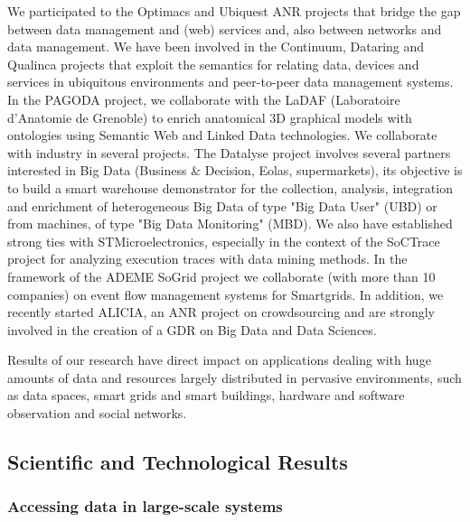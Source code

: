 We participated to the Optimacs and Ubiquest ANR projects that bridge the gap between data management and (web) services and, also  between networks and data management.   
We have been involved in the Continuum, Dataring and Qualinca projects that exploit the semantics for relating data, devices and services in ubiquitous environments and peer-to-peer data management systems. In the PAGODA project, we collaborate with the LaDAF (Laboratoire d'Anatomie de Grenoble) to enrich anatomical 3D graphical models with ontologies using Semantic Web and Linked Data technologies. We collaborate with industry in several projects. The Datalyse project involves several partners interested in Big Data (Business \& Decision, Eolas, supermarkets), its objective is to build a smart warehouse demonstrator for the collection, analysis, integration and enrichment of heterogeneous Big Data  of type "Big Data User" (UBD) or from machines, of type "Big Data Monitoring" (MBD).   We also have established strong ties with STMicroelectronics, especially in the context of the SoCTrace project for analyzing execution traces with data mining methods. In the framework of the ADEME SoGrid project we collaborate (with more than 10 companies) on  event flow management systems for Smartgrids.  In addition,  we recently started ALICIA, an ANR project on crowdsourcing and are strongly involved in the creation of a GDR on Big Data and Data Sciences.  

Results of our research have direct impact on applications dealing with huge amounts of data and resources largely distributed in pervasive environments, such as data spaces, smart grids and smart buildings, hardware and software observation and social networks.

\subsection{Scientific and Technological Results} %
\label{sub:hadas_scientific_and_technological_results}

\subsubsection{Accessing data in large-scale systems}
\label{optimisation}

